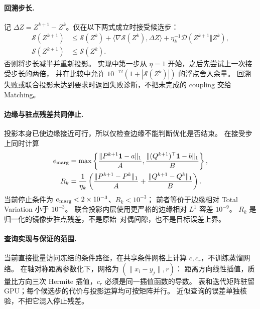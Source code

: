 \documentclass[UTF8,a4paper,11pt,fontset=fandol]{ctexart}
\begin{document}
\paragraph{回溯步长.}
记 $\Delta Z=Z^{k+1}-Z^k$。仅在以下两式成立时接受候选步：
\begin{equation}
\begin{aligned}
\mathscr S(Z^{k+1})&\le\mathscr S(Z^k)
+\langle\nabla\mathscr S(Z^k),\Delta Z\rangle
+\eta_k^{-1}\mathcal D(Z^{k+1}\Vert Z^k),\\
\mathscr S(Z^{k+1})&\le\mathscr S(Z^k).
\end{aligned}
\label{eq:mirror-backtracking}
\end{equation}
否则将步长减半并重新投影。
实现中第一步从 $\eta=1$ 开始，之后先尝试上一次接受步长的两倍，
并在比较中允许 $10^{-12}(1+|\mathscr S(Z^k)|)$ 的浮点舍入余量。
回溯失败或联合投影未达到要求时返回失败诊断，不把未完成的 coupling 交给 Matching。

\paragraph{边缘与驻点残差共同停止.}
投影本身已使边缘接近可行，所以仅检查边缘不能判断优化是否结束。
在接受步上同时计算
\begin{equation}
\begin{aligned}
e_{\rm marg}&=\max\left\{
\frac{\|P^{k+1}\mathbf1-a\|_1}{A},
\frac{\|(Q^{k+1})^\top\mathbf1-b\|_1}{B}\right\},\\
R_k&=\frac1{\eta_k}\left(
\frac{\|P^{k+1}-P^k\|_1}{A}
+\frac{\|Q^{k+1}-Q^k\|_1}{B}\right).
\end{aligned}
\label{eq:coupling-stopping-residual}
\end{equation}
当前停止条件为 $e_{\rm marg}<2\times10^{-3}$、$R_k<10^{-3}$；
前者等价于边缘相对 Total Variation 小于 $10^{-3}$。
联合投影内层使用更严格的边缘相对 $L^1$ 容差 $10^{-9}$。
$R_k$ 是归一化的镜像步驻点残差，不是原始--对偶间隙，也不是目标误差上界。

\paragraph{查询实现与保证的范围.}
当前直接批量访问冻结的条件路径，在共享条件网格上计算 $c,c_r$，不训练蒸馏网络。
在轴对称距离参数化下，网格为 $(\|x_i-y_j\|,r)$：
距离方向线性插值，质量比方向三次 Hermite 插值，$c_r$ 必须是同一插值函数的导数。
表和迭代矩阵驻留 GPU；每个候选步的代价与投影运算均可按矩阵并行。
近似查询的误差单独核验，不把它混入停止残差。
\end{document}

